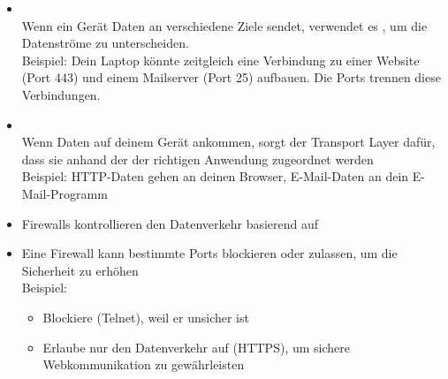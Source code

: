 \begin{itemize}
\begin{infoBox}[title=Portnummern: Kategorien]
\begin{enumerate}
        \end{enumerate}
    \end{infoBox}
    \begin{infoBox}[title=Multiplexing und Demultiplexing mit Ports]
        \begin{itemize}
            \item {}\\
            Wenn ein Gerät Daten an verschiedene Ziele sendet, verwendet es , um die Datenströme zu unterscheiden. \\
            Beispiel: Dein Laptop könnte zeitgleich eine Verbindung zu einer Website (Port 443) und einem Mailserver (Port 25) aufbauen. Die Ports trennen diese Verbindungen.
            \item {}\\
            Wenn Daten auf deinem Gerät ankommen, sorgt der Transport Layer dafür, dass sie anhand der  der richtigen Anwendung zugeordnet werden\\
            Beispiel: HTTP-Daten gehen an deinen Browser, E-Mail-Daten an dein E-Mail-Programm
        \end{itemize}
    \end{infoBox}
    \begin{infoBox}[title=Firewall und Ports]
        \begin{itemize}
            \item Firewalls kontrollieren den Datenverkehr basierend auf 
            \item Eine Firewall kann bestimmte Ports blockieren oder zulassen, um die Sicherheit zu erhöhen\\
            Beispiel:
            \begin{itemize}
                \item Blockiere  (Telnet), weil er unsicher ist
                \item Erlaube nur den Datenverkehr auf (HTTPS), um sichere Webkommunikation zu gewährleisten
            \end{itemize}
        \end{itemize}
    \end{infoBox}
\end{itemize}
